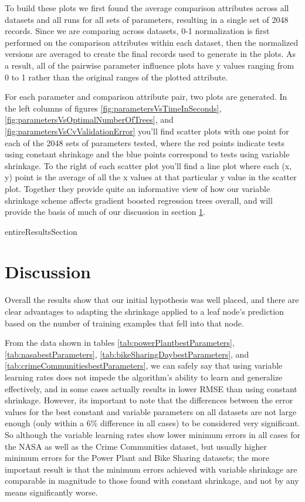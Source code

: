 \documentclass[9pt, conference]{IEEEtran}
\begin{document}
To build these plots we first found the average comparison attributes across all datasets and all runs for all sets of parameters, resulting in a single set of 2048 records. Since we are comparing across datasets, 0-1 normalization is first performed on the comparison attributes within each dataset, then the normalized versions are averaged to create the final records used to generate in the plots. As a result, all of the pairwise parameter influence plots have y values ranging from 0 to 1 rather than the original ranges of the plotted attribute.


For each parameter and comparison attribute pair, two plots are generated. In the left columns of figures
\ref{fig:parametersVsTimeInSeconds},
\ref{fig:parametersVsOptimalNumberOfTrees}, and
\ref{fig:parametersVsCvValidationError} you'll find scatter plots with one point for each of the 2048 sets of parameters tested, where the red points indicate tests using constant shrinkage and the blue points correspond to tests using variable shrinkage. To the right of each scatter plot you'll find a line plot where each (x, y) point is the average of all the x values at that particular y value in the scatter plot. Together they provide quite an informative view of how our variable shrinkage scheme affects gradient boosted regression trees overall, and will provide the basis of much of our discussion in section \ref{sec:discussion}.
	

{entireResultsSection}

\newpage
\section{Discussion}
\label{sec:discussion}

Overall the results show that our initial hypothesis was well placed, and there are clear advantages to adapting the shrinkage applied to a leaf node's prediction based on the number of training examples that fell into that node. 

From the data shown in tables \ref{tab:powerPlantbestParameters}, \ref{tab:nasabestParameters}, \ref{tab:bikeSharingDaybestParameters}, and \ref{tab:crimeCommunitiesbestParameters}, we can safely say that using variable learning rates does not impede the algorithm's ability to learn and generalize effectively, and in some cases actually results in lower RMSE than using constant shrinkage. However, its important to note that the differences between the error values for the best constant and variable parameters on all datasets are not large enough (only within a 6\% difference in all cases) to be considered very significant. So although the variable learning rates show lower minimum errors in all cases for the NASA as well as the Crime Communities dataset, but usually higher minimum errors for the Power Plant and Bike Sharing datasets; the more important result is that the minimum errors achieved with variable shrinkage are comparable in magnitude to those found with constant shrinkage, and not by any means significantly worse.
\end{document}
